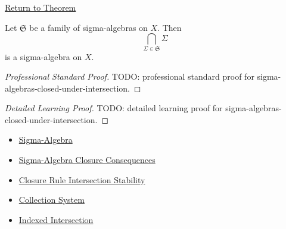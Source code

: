 \newpage
{}
\label{prf:sigma-algebras-closed-under-intersection}

\begin{remark*}[Return]
\hyperref[thm:sigma-algebras-closed-under-intersection]{Return to Theorem}
\end{remark*}

\begin{theorem*}
Let \(\mathfrak S\) be a family of sigma-algebras on \(X\).  Then
\[
  \bigcap_{\Sigma\in\mathfrak S}\Sigma
\]
is a sigma-algebra on \(X\).
\end{theorem*}

\begin{proof}[Professional Standard Proof]
\LRAProofBodyStart
TODO: professional standard proof for sigma-algebras-closed-under-intersection.
\end{proof}

\begin{proof}[Detailed Learning Proof]
\LRAProofBodyStart
TODO: detailed learning proof for sigma-algebras-closed-under-intersection.
\end{proof}

\begin{remark*}
\end{remark*}

\begin{dependencies}
\begin{itemize}
  \item \hyperref[def:sigma-algebra]{Sigma-Algebra}
  \item \hyperref[thm:sigma-algebra-closure-consequences]{Sigma-Algebra Closure Consequences}
  \item \hyperref[thm:closure-rule-intersection-stability]{Closure Rule Intersection Stability}
  \item \hyperref[def:collection-system]{Collection System}
  \item \hyperref[def:indexed-intersection]{Indexed Intersection}
\end{itemize}
\end{dependencies}

\clearpage
